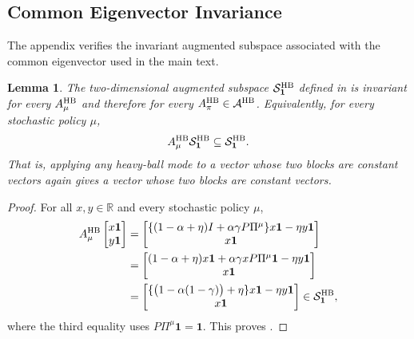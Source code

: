 \documentclass[letterpaper]{article}
\numberwithin{equation}{section}
\newtheorem{lemma}{Lemma}[section]
\newcommand{\R}{\mathbb{R}}
\begin{document}
\subsection{Common Eigenvector Invariance}
\label{app:common-eigenvector-invariance}

The appendix verifies the invariant augmented subspace associated with the common eigenvector used in the
main text.
\begin{lemma}
\label{lem:hb-common-eigenvector-invariance}
The two-dimensional augmented subspace $\mathcal S_{\mathbf{1}}^{\rm HB}$ defined in
 is invariant for every $A_\mu^{\rm HB}$
and therefore for every $A_\pi^{\rm HB}\in\mathcal A^{\rm HB}$. Equivalently, for every stochastic policy
$\mu$,
\begin{equation*}
  A_\mu^{\rm HB}\mathcal S_{\mathbf{1}}^{\rm HB}
  \subseteq \mathcal S_{\mathbf{1}}^{\rm HB}.
\end{equation*}
That is, applying any heavy-ball mode to a vector whose two blocks are constant
vectors again gives a vector whose two blocks are constant vectors.
\end{lemma}
\begin{proof}
For all $x,y\in\R$ and every stochastic policy $\mu$,
\begin{align*}
  A_\mu^{\rm HB}
  \begin{bmatrix}x\mathbf{1}\\y\mathbf{1}\end{bmatrix}
  &=
  \begin{bmatrix}
    \{(1-\alpha+\eta)I+\alpha\gamma P\Pi^\mu\}x\mathbf{1}-\eta y\mathbf{1}\\
    x\mathbf{1}
  \end{bmatrix}\\
  &=
  \begin{bmatrix}
    (1-\alpha+\eta)x\mathbf{1}+\alpha\gamma xP\Pi^\mu\mathbf{1}-\eta y\mathbf{1}\\
    x\mathbf{1}
  \end{bmatrix}\\
  &=
  \begin{bmatrix}
    \{\bigl(1-\alpha(1-\gamma)\bigr)+\eta\}x\mathbf{1}-\eta y\mathbf{1}\\
    x\mathbf{1}
  \end{bmatrix}
  \in\mathcal S_{\mathbf{1}}^{\rm HB},
\end{align*}
where the third equality uses $P\Pi^\mu\mathbf{1}=\mathbf{1}$. This proves
.
\end{proof}
\end{document}
